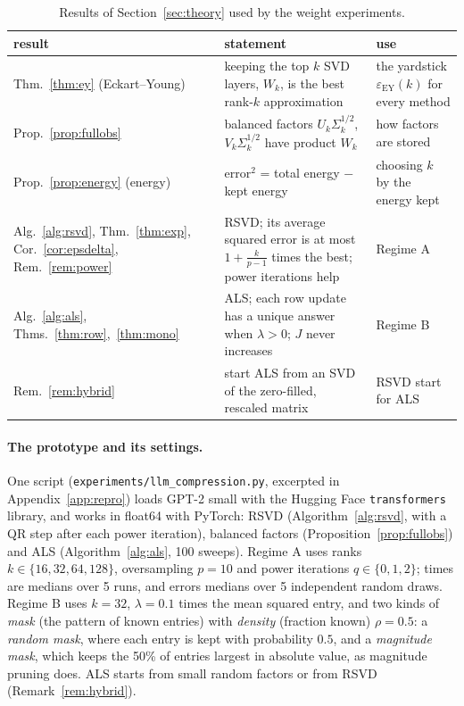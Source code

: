 \documentclass[10pt]{article}
\theoremstyle{plain}
\theoremstyle{definition}
\theoremstyle{remark}
\newcommand{\epsEY}{\varepsilon_{\mathrm{EY}}}
\begin{document}
\begin{table}[!tb]
\centering\small
\begin{tabularx}{\textwidth}{@{}>{\raggedright}p{3.4cm} >{\raggedright}X >{\raggedright\arraybackslash}p{3.4cm}@{}}
\toprule
\textbf{result} & \textbf{statement} & \textbf{use}\\
\midrule
Thm.~\ref{thm:ey} (Eckart--Young) & keeping the top $k$ SVD layers, $W_k$, is the best rank-$k$ approximation & the yardstick $\epsEY(k)$ for every method\\
Prop.~\ref{prop:fullobs} & balanced factors $U_k\Sigma_k^{1/2}$, $V_k\Sigma_k^{1/2}$ have product $W_k$ & how factors are stored\\
Prop.~\ref{prop:energy} (energy) & error$^2$ = total energy $-$ kept energy & choosing $k$ by the energy kept\\
Alg.~\ref{alg:rsvd}, Thm.~\ref{thm:exp}, Cor.~\ref{cor:epsdelta}, Rem.~\ref{rem:power} & RSVD; its average squared error is at most $1+\frac{k}{p-1}$ times the best; power iterations help & Regime A\\
Alg.~\ref{alg:als}, Thms.~\ref{thm:row},~\ref{thm:mono} & ALS; each row update has a unique answer when $\lambda>0$; $J$ never increases & Regime B\\
Rem.~\ref{rem:hybrid} & start ALS from an SVD of the zero-filled, rescaled matrix & RSVD start for ALS\\
\bottomrule
\end{tabularx}
\caption{Results of Section~\ref{sec:theory} used by the weight experiments.}
\label{tab:framework}
\end{table}

\paragraph{The prototype and its settings.}
One script (\texttt{experiments/llm\_compression.py}, excerpted in Appendix~\ref{app:repro}) loads GPT-2 small with the Hugging Face \texttt{transformers} library, and works in float64 with PyTorch: RSVD (Algorithm~\ref{alg:rsvd}, with a QR step after each power iteration), balanced factors (Proposition~\ref{prop:fullobs}) and ALS (Algorithm~\ref{alg:als}, 100 sweeps). Regime A uses ranks $k\in\{16,32,64,128\}$, oversampling $p=10$ and power iterations $q\in\{0,1,2\}$; times are medians over 5 runs, and errors medians over 5 independent random draws. Regime B uses $k=32$, $\lambda=0.1$ times the mean squared entry, and two kinds of \emph{mask} (the pattern of known entries) with \emph{density} (fraction known) $\rho=0.5$: a \emph{random mask}, where each entry is kept with probability $0.5$, and a \emph{magnitude mask}, which keeps the 50\% of entries largest in absolute value, as magnitude pruning does. ALS starts from small random factors or from RSVD (Remark~\ref{rem:hybrid}).
\end{document}

